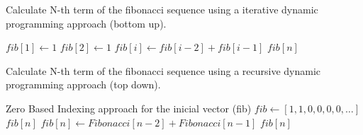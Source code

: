 \documentclass[12pt]{article}
\newcommand{\To}{\textbf{ to }}
\begin{document}
\begin{algorithm}

  \caption{Calculate N-th term of the fibonacci sequence using a iterative dynamic programming approach (bottom up).}
  \begin{algorithmic}[1]
    \Statex
        \State $fib[1] \gets 1$
        \State $fib[2] \gets 1$
        \For {$i = 3 \To n$}
            \State $fib[i] \gets fib[i - 2] + fib[i - 1]$
        \EndFor
        \Return $fib[n]$
    \EndFunction
  \end{algorithmic}
  
\end{algorithm}
\begin{algorithm}

  \caption{Calculate N-th term of the fibonacci sequence using a recursive dynamic programming approach (top down).}
  \begin{algorithmic}[1]
    \Ensure Zero Based Indexing approach for the inicial vector (fib)
    \State $fib \gets [1, 1, 0, 0, 0, 0, \dots]$
    \Statex
            \State \Return $fib[n]$
        \EndIf
        \State $fib[n] \gets Fibonacci[n - 2] + Fibonacci[n - 1]$
        \State \Return $fib[n]$
    \EndFunction
  \end{algorithmic}
\end{algorithm}
\end{document}
